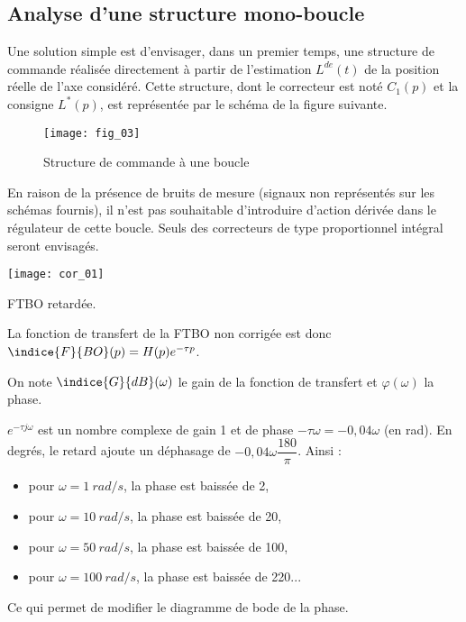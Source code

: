 \fi

\subsection*{Analyse d’une structure mono-boucle}

Une solution simple est d’envisager, dans un premier temps, une structure de commande réalisée directement à
partir de l’estimation $L^{de}(t)$ de la position réelle de l’axe considéré. Cette structure, dont le correcteur est noté
$C_1(p)$ et la consigne $L^{*}(p)$, est représentée par le schéma de la figure suivante.



\begin{figure}[!h]
\texttt{[image: fig\_03]}
\caption{Structure de commande à une boucle}
\end{figure}

En raison de la présence de bruits de mesure (signaux non représentés sur les schémas fournis), il n’est pas
souhaitable d’introduire d’action dérivée dans le régulateur de cette boucle. Seuls des correcteurs de type
proportionnel intégral seront envisagés.


\ifprof
\begin{marginfigure}
\texttt{[image: cor\_01]}
\caption{FTBO retardée.}
\end{marginfigure}
\begin{corrige}
La fonction de transfert de la FTBO non corrigée est donc $\indice{F}{BO}(p)=H(p)e^{-\tau p}$.

On note $\indice{G}{dB}(\omega)$ le gain de la fonction de transfert et $\varphi(\omega)$ la phase. 
 
$e^{-\tau j \omega}$ est un nombre complexe de gain 1 et de phase $-\tau\omega = -0,04 \omega $ (en rad). 
En degrés, le retard ajoute un déphasage de  $-0,04 \omega \dfrac{180}{\pi}$. 
Ainsi :
\begin{itemize}
\item pour $\omega = \SI{1}{rad/s}$, la phase est baissée de 2\degres,
\item pour $\omega = \SI{10}{rad/s}$, la phase est baissée de 20\degres,
\item pour $\omega = \SI{50}{rad/s}$, la phase est baissée de 100\degres,
\item pour $\omega = \SI{100}{rad/s}$, la phase est baissée de 220\degres ...
\end{itemize}
Ce qui permet de modifier le diagramme de bode de la phase. 

\end{corrige}
\else
\fi


